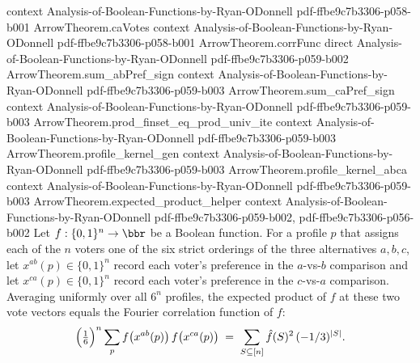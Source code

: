 \begin{lemma}
  {context}
  {Analysis-of-Boolean-Functions-by-Ryan-ODonnell}
  {pdf-ffbe9c7b3306-p058-b001}
\proofstep
  {ArrowTheorem.caVotes}
  {context}
  {Analysis-of-Boolean-Functions-by-Ryan-ODonnell}
  {pdf-ffbe9c7b3306-p058-b001}
\proofstep
  {ArrowTheorem.corrFunc}
  {direct}
  {Analysis-of-Boolean-Functions-by-Ryan-ODonnell}
  {pdf-ffbe9c7b3306-p059-b002}
\proofstep
  {ArrowTheorem.sum_abPref_sign}
  {context}
  {Analysis-of-Boolean-Functions-by-Ryan-ODonnell}
  {pdf-ffbe9c7b3306-p059-b003}
\proofstep
  {ArrowTheorem.sum_caPref_sign}
  {context}
  {Analysis-of-Boolean-Functions-by-Ryan-ODonnell}
  {pdf-ffbe9c7b3306-p059-b003}
\proofstep
  {ArrowTheorem.prod_finset_eq_prod_univ_ite}
  {context}
  {Analysis-of-Boolean-Functions-by-Ryan-ODonnell}
  {pdf-ffbe9c7b3306-p059-b003}
\proofstep
  {ArrowTheorem.profile_kernel_gen}
  {context}
  {Analysis-of-Boolean-Functions-by-Ryan-ODonnell}
  {pdf-ffbe9c7b3306-p059-b003}
\proofstep
  {ArrowTheorem.profile_kernel_abca}
  {context}
  {Analysis-of-Boolean-Functions-by-Ryan-ODonnell}
  {pdf-ffbe9c7b3306-p059-b003}
\proofstep
  {ArrowTheorem.expected_product_helper}
  {context}
  {Analysis-of-Boolean-Functions-by-Ryan-ODonnell}
  {pdf-ffbe9c7b3306-p059-b002,
    pdf-ffbe9c7b3306-p056-b002}
Let $f:\{0,1\}^n\to\bbr$ be a Boolean function. For a profile $p$ that assigns each of
the $n$ voters one of the six strict orderings of the three alternatives $a,b,c$, let
$x^{ab}(p)\in\{0,1\}^n$ record each voter's preference in the $a$-vs-$b$ comparison and
let $x^{ca}(p)\in\{0,1\}^n$ record each voter's preference in the $c$-vs-$a$ comparison.
Averaging uniformly over all $6^n$ profiles, the expected product of $f$ at these two
vote vectors equals the Fourier correlation function of $f$:
\[
  \Bigl(\tfrac{1}{6}\Bigr)^{n}\sum_{p} f\bigl(x^{ab}(p)\bigr)\,f\bigl(x^{ca}(p)\bigr)
  \;=\; \sum_{S\subseteq[n]} \hat f(S)^{2}\,(-1/3)^{|S|}.
\]
\end{lemma}
